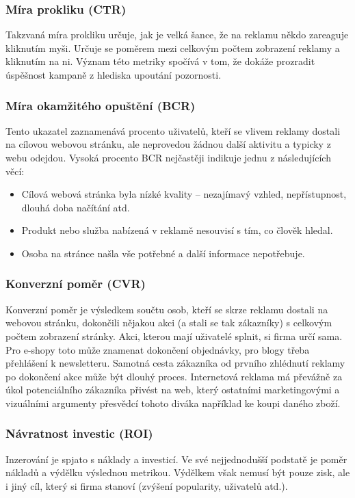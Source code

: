         \subsubsection{Míra prokliku (CTR)}
        Takzvaná míra prokliku určuje, jak je velká šance, že na reklamu někdo zareaguje kliknutím myši. Určuje se poměrem mezi celkovým počtem zobrazení reklamy a
        kliknutím na ni. Význam této metriky spočívá v tom, že dokáže prozradit úspěšnost kampaně z hlediska upoutání pozornosti.

        \subsubsection{Míra okamžitého opuštění (BCR)}
        Tento ukazatel zaznamenává procento uživatelů, kteří se vlivem reklamy dostali na cílovou webovou stránku, ale neprovedou žádnou další aktivitu a
        typicky z webu odejdou. Vysoká procento BCR nejčastěji indikuje jednu z následujících věcí:
        \begin{itemize}
            \item Cílová webová stránka byla nízké kvality -- nezajímavý vzhled, nepřístupnost, dlouhá doba načítání atd.
            \item Produkt nebo služba nabízená v reklamě nesouvisí s tím, co člověk hledal.
            \item Osoba na stránce našla vše potřebné a další informace nepotřebuje.
        \end{itemize}

        \subsubsection{Konverzní poměr (CVR)}
        Konverzní poměr je výsledkem součtu osob, kteří se skrze reklamu dostali na webovou stránku, dokončili nějakou akci (a stali se tak zákazníky) s
        celkovým počtem zobrazení stránky. Akci, kterou mají uživatelé splnit, si firma určí sama. Pro e-shopy toto může znamenat dokončení objednávky,
        pro blogy třeba přehlášení k newsletteru. Samotná cesta zákazníka od prvního zhlédnutí reklamy po dokončení akce může být dlouhý proces. Internetová
        reklama má převážně za úkol potenciálního zákazníka přivést na web, který ostatními marketingovými a vizuálními argumenty přesvědcí tohoto diváka například
        ke koupi daného zboží.

        \subsubsection{Návratnost investic (ROI)}
        Inzerování je spjato s náklady a investicí. Ve své nejjednodušší podstatě je poměr nákladů a výdělku výslednou metrikou.
        Výdělkem však nemusí být pouze zisk, ale i jiný cíl, který si firma stanoví (zvýšení popularity, uživatelů atd.).

